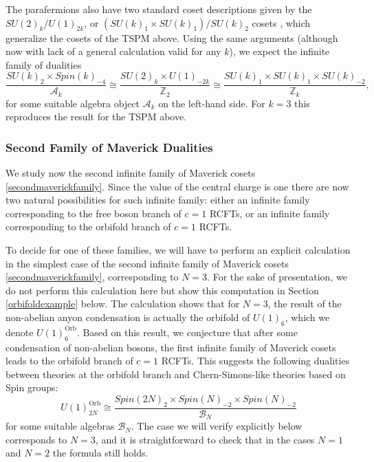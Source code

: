 \documentclass[11pt]{article}
\numberwithin{equation}{section}
\begin{document}
The parafermions also have two standard coset descriptions given by the $SU(2)_{k}/U(1)_{2k}$, or $(SU(k)_{1} \times SU(k)_{1})/SU(k)_{2}$ cosets \cite{DiFrancesco:1997nk}, which generalize the cosets of the TSPM above. Using the same arguments (although now with lack of a general calculation valid for any $k$), we expect the infinite family of dualities
\begin{equation} \label{ParafermionMaverickDuality}
    \boxed{\frac{SU(k)_{2} \times Spin(k)_{-4}}{\mathcal{A}_{k}} \cong \frac{SU(2)_{k} \times U(1)_{-2k}}{\mathbb{Z}_{2}} \cong \frac{SU(k)_{1} \times SU(k)_{1} \times SU(k)_{-2}}{\mathbb{Z}_{k}}},
\end{equation}
for some suitable algebra object $\mathcal{A}_{k}$ on the left-hand side. For $k=3$ this reproduces the result for the TSPM above. 

\subsubsection*{Second Family of Maverick Dualities}

We study now the second infinite family of Maverick cosets \eqref{secondmaverickfamily}. Since the value of the central charge is one there are now two natural possibilities for such infinite family: either an infinite family corresponding to the free boson branch of $c=1$ RCFTs, or an infinite family corresponding to the orbifold branch of $c=1$ RCFTs. 

To decide for one of these families, we will have to perform an explicit calculation in the simplest case of the second infinite family of Maverick cosets \eqref{secondmaverickfamily}, corresponding to $N=3$. For the sake of presentation, we do not perform this calculation here but show this computation in Section \ref{orbifoldexample} below. The calculation shows that for $N=3$, the result of the non-abelian anyon condensation is actually the orbifold of $U(1)_{6}$, which we denote $U(1)^{\mathrm{Orb}}_{6}$. Based on this result, we conjecture that after some condensation of non-abelian bosons, the first infinite family of Maverick cosets leads to the orbifold branch of $c=1$ RCFTs. This suggests the following dualities between theories at the orbifold branch and Chern-Simons-like theories based on Spin groups:
\begin{equation} \label{secondduality}
    \boxed{U(1)_{2N}^{\mathrm{Orb}} \cong \frac{Spin(2N)_{2} \times Spin(N)_{-2} \times Spin(N)_{-2}}{\mathcal{B}_{N}}}
\end{equation}
for some suitable algebras $\mathcal{B}_{N}$. The case we will verify explicitly below corresponds to $N=3$, and it is straightforward to check that in the cases $N=1$ and $N=2$ the formula still holds.
\end{document}
